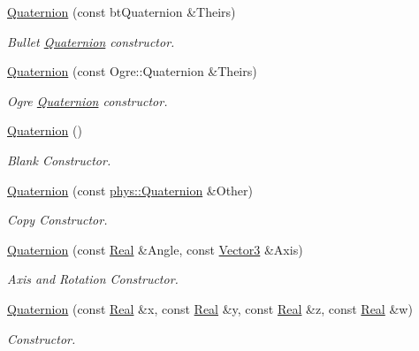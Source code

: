 \begin{DoxyCompactItemize}
\hyperlink{classphys_1_1Quaternion_ab9f13d19fe7d602d7c5feaed0aaf4620}{Quaternion} (const btQuaternion \&Theirs)
\begin{DoxyCompactList}\small\item\em Bullet \hyperlink{classphys_1_1Quaternion}{Quaternion} constructor. \item\end{DoxyCompactList}\item 
\hyperlink{classphys_1_1Quaternion_a4902c05489ebae03a55433d947c53d03}{Quaternion} (const Ogre::Quaternion \&Theirs)
\begin{DoxyCompactList}\small\item\em Ogre \hyperlink{classphys_1_1Quaternion}{Quaternion} constructor. \item\end{DoxyCompactList}\item 
\hyperlink{classphys_1_1Quaternion_aca4ee6fd6d3967f06cc4a32361fa5a62}{Quaternion} ()
\begin{DoxyCompactList}\small\item\em Blank Constructor. \item\end{DoxyCompactList}\item 
\hyperlink{classphys_1_1Quaternion_a46d08f43b0b638a256344b3919ba9e0d}{Quaternion} (const \hyperlink{classphys_1_1Quaternion}{phys::Quaternion} \&Other)
\begin{DoxyCompactList}\small\item\em Copy Constructor. \item\end{DoxyCompactList}\item 
\hyperlink{classphys_1_1Quaternion_a9246247b7b28f19839148415a7ddeb96}{Quaternion} (const \hyperlink{namespacephys_af7eb897198d265b8e868f45240230d5f}{Real} \&Angle, const \hyperlink{classphys_1_1Vector3}{Vector3} \&Axis)
\begin{DoxyCompactList}\small\item\em Axis and Rotation Constructor. \item\end{DoxyCompactList}\item 
\hyperlink{classphys_1_1Quaternion_ac8037875c08ce10c0195f3e6fd08b172}{Quaternion} (const \hyperlink{namespacephys_af7eb897198d265b8e868f45240230d5f}{Real} \&x, const \hyperlink{namespacephys_af7eb897198d265b8e868f45240230d5f}{Real} \&y, const \hyperlink{namespacephys_af7eb897198d265b8e868f45240230d5f}{Real} \&z, const \hyperlink{namespacephys_af7eb897198d265b8e868f45240230d5f}{Real} \&w)
\begin{DoxyCompactList}\small\item\em Constructor. \item\end{DoxyCompactList}\end{DoxyCompactItemize}
